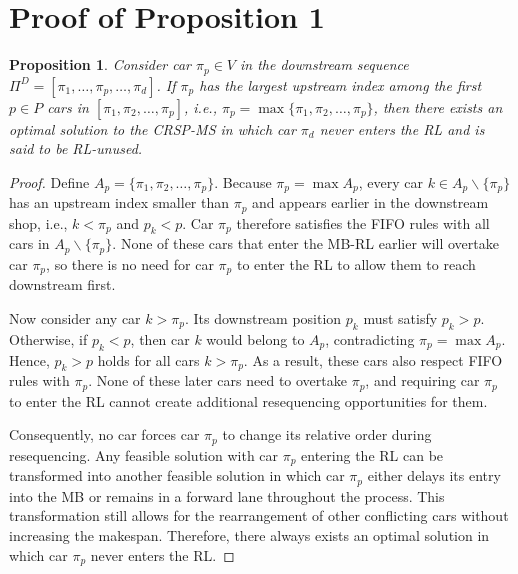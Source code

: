 \documentclass[12pt]{article}
\newtheorem{proposition}[theorem]{Proposition}
\begin{document}
\section{Proof of Proposition 1}
\begin{proposition}
Consider car $\pi_{p}\in V$ in the downstream sequence $\Pi^{D}=[\pi_1,\dots,\pi_p,\dots,\pi_{d}]$. If $\pi_p$ has the largest upstream index among the first $p\in P$ cars in $[\pi_1,\pi_2,\dots,\pi_p]$, i.e., $\pi_p=\max\{\pi_1,\pi_2,\dots,\pi_p\}$, then there exists an optimal solution to the CRSP-MS in which car $\pi_d$ never enters the RL and is said to be RL-unused.
\end{proposition}
\begin{proof}
    Define $A_p=\{\pi_1,\pi_2,\dots,\pi_p\}$. Because $\pi_p=\max A_p$, every car $k\in A_p\backslash\{\pi_p\}$ has an upstream index smaller than $\pi_p$ and appears earlier in the downstream shop, i.e., $k<\pi_p$ and $p_k<p$. Car $\pi_p$ therefore satisfies the FIFO rules with all cars in $A_p\backslash \{\pi_p\}$. None of these cars that enter the MB-RL earlier will overtake car $\pi_p$, so there is no need for car $\pi_p$ to enter the RL to allow them to reach downstream first.

    Now consider any car $k>\pi_p$. Its downstream position $p_k$ must satisfy $p_k>p$. Otherwise, if $p_k<p$, then car $k$ would belong to $A_p$, contradicting $\pi_p=\max A_p$. Hence, $p_k>p$ holds for all cars $k>\pi_p$. As a result, these cars also respect FIFO rules with $\pi_p$. None of these later cars need to overtake $\pi_p$, and requiring car $\pi_p$ to enter the RL cannot create additional resequencing opportunities for them.

    Consequently, no car forces car $\pi_p$ to change its relative order during resequencing. Any feasible solution with car $\pi_p$ entering the RL can be transformed into another feasible solution in which car $\pi_p$ either delays its entry into the MB or remains in a forward lane throughout the process. This transformation still allows for the rearrangement of other conflicting cars without increasing the makespan. Therefore, there always exists an optimal solution in which car $\pi_p$ never enters the RL.
\end{proof}
\end{document}
